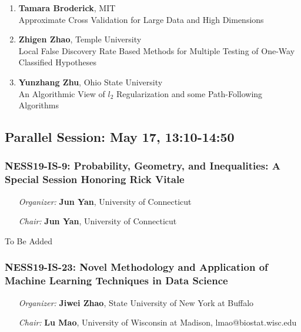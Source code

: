 \begin{enumerate}
\item \textbf{Tamara Broderick}, MIT \\
Approximate Cross Validation for Large Data and High Dimensions
\item \textbf{Zhigen Zhao}, Temple University \\
Local False Discovery Rate Based Methods for Multiple Testing of One-Way Classified Hypotheses
\item \textbf{Yunzhang Zhu}, Ohio State University \\
An Algorithmic View of $l_2$ Regularization and some Path-Following Algorithms
\end{enumerate}

\subsection*{Parallel Session: May 17, 13:10-14:50}

\subsubsection*{NESS19-IS-9: Probability, Geometry, and Inequalities: A Special Session Honoring Rick Vitale}

\begin{enumerate}[align=left]
\item [\emph{Organizer:}] \textbf{Jun Yan}, University of Connecticut \\
\item [\emph{Chair:}] \textbf{Jun Yan}, University of Connecticut
\end{enumerate}

To Be Added

\subsubsection*{NESS19-IS-23: Novel Methodology and Application of Machine Learning Techniques in Data Science}

\begin{enumerate}[align=left]
\item [\emph{Organizer:}] \textbf{Jiwei Zhao}, State University of New York at Buffalo \\
\item [\emph{Chair:}] \textbf{Lu Mao},  University of Wisconsin at Madison, lmao@biostat.wisc.edu
\end{enumerate}

